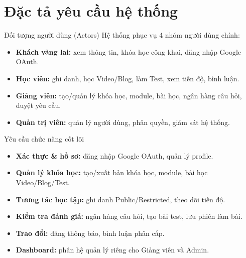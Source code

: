 \documentclass[10pt]{beamer}
\begin{document}
\section{Đặc tả yêu cầu hệ thống}

\begin{frame}{Đối tượng người dùng (Actors)}
    Hệ thống phục vụ 4 nhóm người dùng chính:
    \vspace{0.2cm}
    \begin{itemize}
        \item \textbf{Khách vãng lai:} xem thông tin, khóa học công khai, đăng nhập Google OAuth.
        \item \textbf{Học viên:} ghi danh, học Video/Blog, làm Test, xem tiến độ, bình luận.
        \item \textbf{Giảng viên:} tạo/quản lý khóa học, module, bài học, ngân hàng câu hỏi, duyệt yêu cầu.
        \item \textbf{Quản trị viên:} quản lý người dùng, phân quyền, giám sát hệ thống.
    \end{itemize}
\end{frame}

\begin{frame}{Yêu cầu chức năng cốt lõi}
    \begin{itemize}
        \item \textbf{Xác thực \& hồ sơ:} đăng nhập Google OAuth, quản lý profile.
        \item \textbf{Quản lý khóa học:} tạo/xuất bản khóa học, module, bài học Video/Blog/Test.
        \item \textbf{Tương tác học tập:} ghi danh Public/Restricted, theo dõi tiến độ.
        \item \textbf{Kiểm tra đánh giá:} ngân hàng câu hỏi, tạo bài test, lưu phiên làm bài.
        \item \textbf{Trao đổi:} đăng thông báo, bình luận phân cấp.
        \item \textbf{Dashboard:} phân hệ quản lý riêng cho Giảng viên và Admin.
    \end{itemize}
\end{frame}
\end{document}
